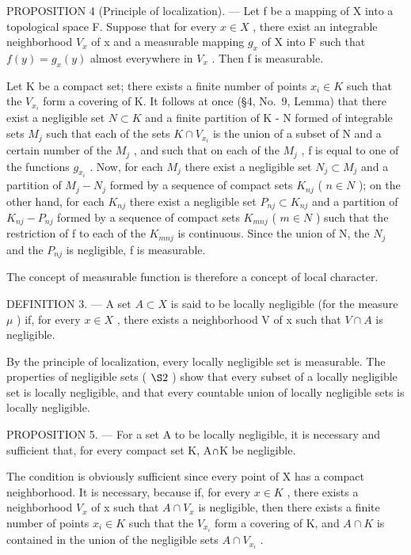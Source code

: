 PROPOSITION 4 (Principle of localization). --- Let f be a mapping of X into a topological space F. Suppose that for every \(x \in X\) , there exist an integrable neighborhood \(V_{x}\) of x and a measurable mapping \(g_{x}\) of X into F such that \(f(y) = g_{x}(y)\) almost everywhere in \(V_{x}\) . Then f is measurable.

Let K be a compact set; there exists a finite number of points \(x_{i} \in K\) such that the \(V_{x_{i}}\) form a covering of K. It follows at once (§4, No.~9, Lemma) that there exist a negligible set \(N \subset K\) and a finite partition of K - N formed of integrable sets \(M_{j}\) such that each of the sets \(K \cap V_{x_{i}}\) is the union of a subset of N and a certain number of the \(M_{j}\) , and such that on each of the \(M_{j}\) , f is equal to one of the functions \(g_{x_{i}}\) . Now, for each \(M_{j}\) there exist a negligible set \(N_{j} \subset M_{j}\) and a partition of \(M_{j} - N_{j}\) formed by a sequence of compact sets \(K_{nj}\) ( \(n \in N\) ); on the other hand, for each \(K_{nj}\) there exist a negligible set \(P_{nj} \subset K_{nj}\) and a partition of \(K_{nj} - P_{nj}\) formed by a sequence of compact sets \(K_{mnj}\) ( \(m \in N\) ) such that the restriction of f to each of the \(K_{mnj}\) is continuous. Since the union of N, the \(N_{j}\) and the \(P_{nj}\) is negligible, f is measurable.

The concept of measurable function is therefore a concept of local character.

DEFINITION 3. --- A set \(A \subset X\) is said to be locally negligible (for the measure \(\mu\) ) if, for every \(x \in X\) , there exists a neighborhood V of x such that \(V \cap A\) is negligible.

By the principle of localization, every locally negligible set is measurable. The properties of negligible sets ( \(\S2\) ) show that every subset of a locally negligible set is locally negligible, and that every countable union of locally negligible sets is locally negligible.

PROPOSITION 5. --- For a set A to be locally negligible, it is necessary and sufficient that, for every compact set K, A∩K be negligible.

The condition is obviously sufficient since every point of X has a compact neighborhood. It is necessary, because if, for every \(x \in K\) , there exists a neighborhood \(V_{x}\) of x such that \(A \cap V_{x}\) is negligible, then there exists a finite number of points \(x_{i} \in K\) such that the \(V_{x_{i}}\) form a covering of K, and \(A \cap K\) is contained in the union of the negligible sets \(A \cap V_{x_{i}}\) .


